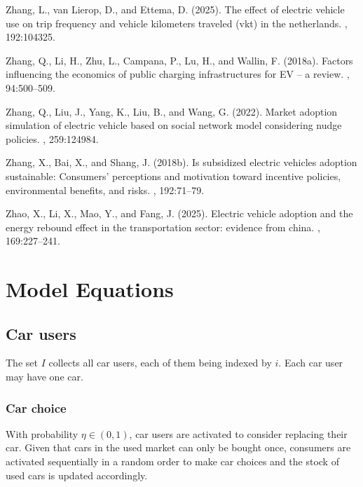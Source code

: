 \documentclass[12pt]{article}
\begin{document}
\begin{thebibliography}{}
Zhang, L., van Lierop, D., and Ettema, D. (2025).
\newblock The effect of electric vehicle use on trip frequency and vehicle
  kilometers traveled (vkt) in the netherlands.
,
  192:104325.

Zhang, Q., Li, H., Zhu, L., Campana, P., Lu, H., and Wallin, F. (2018a).
\newblock Factors influencing the economics of public charging infrastructures
  for {EV} -- a review.
, 94:500--509.

Zhang, Q., Liu, J., Yang, K., Liu, B., and Wang, G. (2022).
\newblock Market adoption simulation of electric vehicle based on social
  network model considering nudge policies.
, 259:124984.

Zhang, X., Bai, X., and Shang, J. (2018b).
\newblock Is subsidized electric vehicles adoption sustainable: Consumers'
  perceptions and motivation toward incentive policies, environmental benefits,
  and risks.
, 192:71--79.

Zhao, X., Li, X., Mao, Y., and Fang, J. (2025).
\newblock Electric vehicle adoption and the energy rebound effect in the
  transportation sector: evidence from china.
, 169:227--241.

\end{thebibliography}
	
	
	\appendix
	
	\section{Model Equations}
	\label{model_equations}
	
	\subsection{Car users} \label{Model_Users}
	The set $I$ collects all car users, each of them being indexed by $i$. Each car user may have one car. 
    
	\subsubsection{Car choice} \label{Users_Choice}
	With probability $\eta\in(0,1)$, car users are activated to consider replacing their car. Given that cars in the used market can only be bought once, consumers are activated sequentially in a random order to make car choices and the stock of used cars is updated accordingly. 
	
\end{document}
